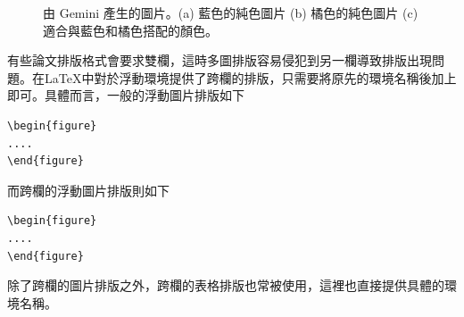 \documentclass[12pt]{report}
\theoremstyle{plain}
\begin{document}
\begin{figure}
    \centering
    
    \caption[使用的多圖排版跨欄演示]{由 Gemini 產生的圖片。(a) 藍色的純色圖片 (b) 橘色的純色圖片 (c) 適合與藍色和橘色搭配的顏色。}
    \label{fig:multifig2}
\end{figure}

有些論文排版格式會要求雙欄，這時多圖排版容易侵犯到另一欄導致排版出現問題。在\LaTeX 中對於浮動環境提供了跨欄的排版，只需要將原先的環境名稱後加上\code{*}即可。具體而言，一般的浮動圖片排版如下
\begin{lstlisting}
\begin{figure}
....
\end{figure}
\end{lstlisting}
而跨欄的浮動圖片排版則如下
\begin{lstlisting}
\begin{figure}
....
\end{figure}
\end{lstlisting}
除了跨欄的圖片排版之外，跨欄的表格排版也常被使用，這裡也直接提供具體的環境名稱。
\end{document}
